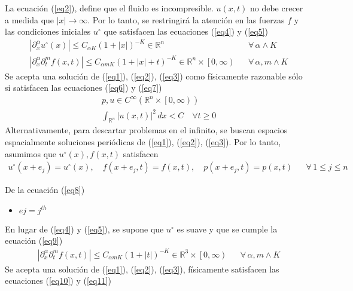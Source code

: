 La ecuación (\ref{eq2}), define que el fluido es incompresible.  $u(x, t)$ no debe crecer a medida que $\left\lvert x\right\rvert \to \infty$. Por lo tanto, se restringirá la atención en las fuerzas $f$ y las condiciones iniciales $u^{\circ}$ que satisfacen las ecuaciones (\ref{eq4}) y (\ref{eq5})
\begin{align}
    &\left\lvert \partial_x^{\alpha}u^{\circ}(x) \right\rvert\leq C_{\alpha K}\left(1 + \left\lvert x \right\rvert  \right)^{-K}\in \mathbb{R}^n&& \forall\, \alpha\land K\label{eq4}\\
    &\left\lvert \partial_x^{\alpha}\partial_t^{m} f(x,t) \right\rvert\leq C_{\alpha m K}\left(1 + \left\lvert x \right\rvert + t \right)^{-K}\in \mathbb{R}^n\times \left[ 0,\infty \right)&& \forall\, \alpha, m \land K \label{eq5}
\end{align}
Se acepta una solución de (\ref{eq1}), (\ref{eq2}), (\ref{eq3}) como físicamente razonable sólo si satisfacen las ecuaciones (\ref{eq6}) y (\ref{eq7})
\begin{align}
    &p,u\in C^{\infty}\left( \mathbb{R}^n \times \left[ 0, \infty\right) \right)\label{eq6}\\
    & \int_{\mathbb{R}^n} \left\lvert u(x,t)\right\rvert^2\, dx < C\quad \forall t\geq 0\label{eq7}  
\end{align}
Alternativamente, para descartar problemas en el infinito, se buscan espacios espacialmente soluciones periódicas de (\ref{eq1}), (\ref{eq2}), (\ref{eq3}). Por lo tanto, asumimos que $u^{\circ}(x), f(x,t)$ satisfacen
\begin{align}
    u^{\circ}(x + e_j) = u^{\circ}(x),\quad f(x + e_j,t) = f(x,t),\quad p(x + e_j,t) = p(x,t) && \forall\, 1\leq j\leq n\label{eq8}
\end{align}
\begin{notation} De la ecuación (\ref{eq8})
    \begin{itemize}
        \item $ej = j^{th}$
    \end{itemize}
\end{notation}
En lugar de (\ref{eq4}) y (\ref{eq5}), se supone que $u^{\circ}$ es suave y que se cumple la ecuación (\ref{eq9})
\begin{align}
    &\left\lvert \partial_x^{\alpha}\partial_t^{m} f(x,t) \right\rvert\leq C_{\alpha m K}\left(1 + \left\lvert t \right\rvert \right)^{-K}\in \mathbb{R}^3\times \left[ 0,\infty \right)&& \forall\, \alpha, m \land K 
    \label{eq9}
\end{align}
Se acepta una solución de (\ref{eq1}), (\ref{eq2}), (\ref{eq3}), físicamente satisfacen las ecuaciones (\ref{eq10}) y (\ref{eq11})
